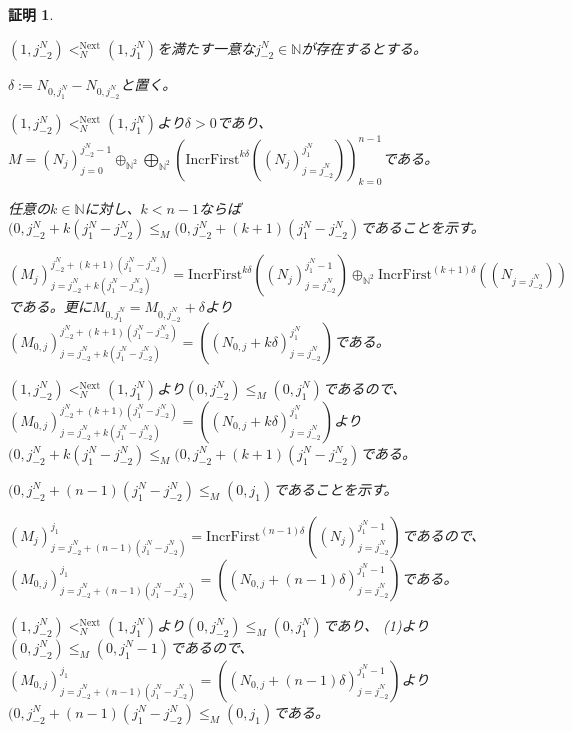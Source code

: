 \documentclass[dvipdfmx,uplatex]{jsarticle}
\theoremstyle{customnonumberbreakfortheorem}
\theoremstyle{customnonumberbreakforproof}
\newtheorem{hideableproof}{証明}
\begin{document}
\begin{hideableproof}
\begin{indented}
\begin{indented}
\begin{indented}
				\item \((1,j_{-2}^N) <_N^{\textrm{Next}} (1,j_1^N)\)を満たす一意な\(j_{-2}^N \in \mathbb{N}\)が存在するとする。
				\begin{indented}
					\item \(\delta := N_{0,j_1^N} - N_{0,j_{-2}^N}\)と置く。
					\item \((1,j_{-2}^N) <_N^{\textrm{Next}} (1,j_1^N)\)より\(\delta > 0\)であり、\(M = (N_j)_{j=0}^{j_{-2}^N-1} \oplus_{\mathbb{N}^2} \bigoplus_{\mathbb{N}^2} (\textrm{IncrFirst}^{k \delta}((N_j)_{j=j_{-2}^N}^{j_1^N}))_{k=0}^{n-1}\)である。
					\item
					\item 任意の\(k \in \mathbb{N}\)に対し、\(k < n-1\)ならば\((0,j_{-2}^N+k(j_1^N-j_{-2}^N) \leq_M (0,j_{-2}^N+(k+1)(j_1^N-j_{-2}^N)\)であることを示す。
					\begin{indented}
						\item \((M_j)_{j =j_{-2}^N+k(j_1^N-j_{-2}^N)}^{j_{-2}^N+(k+1)(j_1^N-j_{-2}^N)} = \textrm{IncrFirst}^{k \delta}((N_j)_{j=j_{-2}^N}^{j_1^N-1}) \oplus_{\mathbb{N}^2} \textrm{IncrFirst}^{(k+1)\delta}((N_{j=j_{-2}^N}))\)である。更に\(M_{0,j_1^N} = M_{0,j_{-2}^N}+\delta\)より\((M_{0,j})_{j =j_{-2}^N+k(j_1^N-j_{-2}^N)}^{j_{-2}^N+(k+1)(j_1^N-j_{-2}^N)} = ((N_{0,j}+k \delta)_{j=j_{-2}^N}^{j_1^N})\)である。
						\item \((1,j_{-2}^N) <_N^{\textrm{Next}} (1,j_1^N)\)より\((0,j_{-2}^N) \leq_M (0,j_1^N)\)であるので、\((M_{0,j})_{j =j_{-2}^N+k(j_1^N-j_{-2}^N)}^{j_{-2}^N+(k+1)(j_1^N-j_{-2}^N)} = ((N_{0,j}+k \delta)_{j=j_{-2}^N}^{j_1^N})\)より\((0,j_{-2}^N+k(j_1^N-j_{-2}^N) \leq_M (0,j_{-2}^N+(k+1)(j_1^N-j_{-2}^N)\)である。
					\end{indented}
					\item
					\item \((0,j_{-2}^N+(n-1)(j_1^N-j_{-2}^N) \leq_M (0,j_1)\)であることを示す。
					\begin{indented}
						\item \((M_j)_{j =j_{-2}^N+(n-1)(j_1^N-j_{-2}^N)}^{j_1} = \textrm{IncrFirst}^{(n-1)\delta}((N_j)_{j=j_{-2}^N}^{j_1^N-1})\)であるので、\((M_{0,j})_{j =j_{-2}^N+(n-1)(j_1^N-j_{-2}^N)}^{j_1} = ((N_{0,j}+(n-1)\delta)_{j=j_{-2}^N}^{j_1^N-1})\)である。
						\item \((1,j_{-2}^N) <_N^{\textrm{Next}} (1,j_1^N)\)より\((0,j_{-2}^N) \leq_M (0,j_1^N)\)であり、 (1)より\((0,j_{-2}^N) \leq_M (0,j_1^N-1)\)であるので、\((M_{0,j})_{j =j_{-2}^N+(n-1)(j_1^N-j_{-2}^N)}^{j_1} = ((N_{0,j}+(n-1)\delta)_{j=j_{-2}^N}^{j_1^N-1})\)より\((0,j_{-2}^N+(n-1)(j_1^N-j_{-2}^N) \leq_M (0,j_1)\)である。

\end{indented}
\end{indented}
\end{indented}
\end{indented}
\end{indented}
\end{hideableproof}
\end{document}
